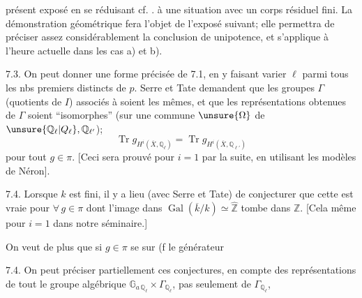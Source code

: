 présent exposé en se réduisant cf. . à  une situation avec un corps résiduel fini. 
 La démonstration géométrique fera l'objet de l'exposé suivant; elle permettra de préciser assez considérablement  la conclusion de unipotence, et  s'applique à l'heure actuelle dans les cas a) et b).

7.3. On peut donner une forme précisée de 7.1, en y faisant varier $\ell$ parmi tous les nbs premiers distincts de $p$. Serre et Tate  demandent que les  groupes $\Gamma$  (quotients de $I$) associés à   soient les mêmes, et que les représentations obtenues de $\Gamma$ soient ``isomorphes'' (sur une  commune $\unsure{\Omega}$ de $\unsure{\mathbb Q_\ell|Q_\ell},\mathbb Q_{\ell'}$);    
 
\[
 \operatorname{Tr}g_{H^i(\overline X,\mathbb Q_\ell)}
 =\operatorname{Tr}g_{H^i(\overline X,\mathbb Q_{\ell'})}
 \tag*{(7.3.1)}
\]
pour tout $g\in\pi$. [Ceci sera prouvé pour $i=1$ par la suite, en utilisant les modèles de Néron]. 

7.4. Lorsque $k$ est fini,  il y a lieu (avec Serre et Tate) de conjecturer que cette   est vraie  pour $\forall\,g\in\pi$ dont l'image dans $\operatorname{Gal}(\overline k/k)\simeq\widehat{\mathbb Z}$ tombe dans $\mathbb Z$. [Cela même   pour $i=1$ dans notre séminaire.]

On veut de plus que si $g\in\pi$ se  sur   (f le générateur

7.4. On peut préciser partiellement ces conjectures, en  compte des représentations de tout le groupe algébrique $\mathbb G_{a\,\mathbb Q_\ell}\times\Gamma_{\mathbb Q_\ell}$, pas seulement de $\Gamma_{\mathbb Q_\ell}$,
